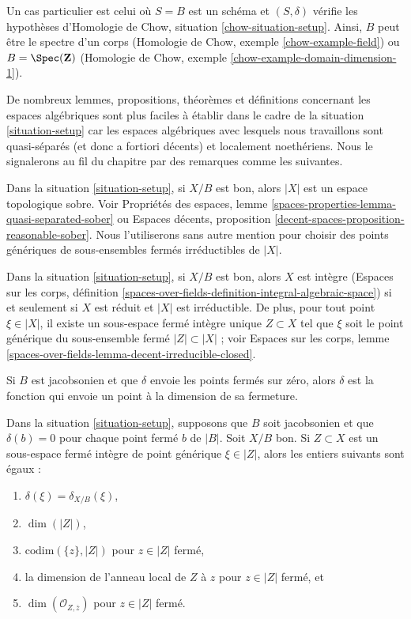\noindent
Un cas particulier est celui où $S = B$ est un schéma et $(S, \delta)$ vérifie
les hypothèses d'Homologie de Chow, situation \ref{chow-situation-setup}.
Ainsi, $B$ peut être le spectre d'un corps (Homologie de Chow, exemple
\ref{chow-example-field}) ou $B = \Spec(\mathbf{Z})$ (Homologie de Chow, exemple
\ref{chow-example-domain-dimension-1}).

\medskip\noindent
De nombreux lemmes, propositions, théorèmes et définitions concernant les
espaces algébriques sont plus faciles à établir dans le cadre de la situation
\ref{situation-setup} car les espaces algébriques avec lesquels nous
travaillons sont quasi-séparés (et donc a fortiori décents) et localement
noethériens. Nous le signalerons au fil du chapitre par des remarques comme
les suivantes.

\begin{remark}
\label{remark-sober}
Dans la situation \ref{situation-setup}, si $X/B$ est bon, alors $|X|$ est un
espace topologique sobre. Voir Propriétés des espaces, lemme
\ref{spaces-properties-lemma-quasi-separated-sober} ou Espaces décents,
proposition \ref{decent-spaces-proposition-reasonable-sober}. Nous
l'utiliserons sans autre mention pour choisir des points génériques de
sous-ensembles fermés irréductibles de $|X|$.
\end{remark}

\begin{remark}
\label{remark-integral}
Dans la situation \ref{situation-setup}, si $X/B$ est bon, alors $X$ est
intègre (Espaces sur les corps, définition
\ref{spaces-over-fields-definition-integral-algebraic-space}) si et seulement
si $X$ est réduit et $|X|$ est irréductible. De plus, pour tout point $\xi \in
|X|$, il existe un sous-espace fermé intègre unique $Z \subset X$ tel que
$\xi$ soit le point générique du sous-ensemble fermé $|Z| \subset |X|$ ; voir
Espaces sur les corps, lemme
\ref{spaces-over-fields-lemma-decent-irreducible-closed}.
\end{remark}

\noindent
Si $B$ est jacobsonien et que $\delta$ envoie les points fermés sur zéro, alors
$\delta$ est la fonction qui envoie un point à la dimension de sa fermeture.

\begin{lemma}
\label{lemma-delta-is-dimension}
Dans la situation \ref{situation-setup}, supposons que $B$ soit jacobsonien et que
$\delta(b) = 0$ pour chaque point fermé $b$ de $|B|$. Soit $X/B$ bon. Si
$Z \subset X$ est un sous-espace fermé intègre de point générique $\xi \in
|Z|$, alors les entiers suivants sont égaux :
\begin{enumerate}
\item $\delta(\xi) = \delta_{X/B}(\xi)$,
\item $\dim(|Z|)$,
\item $\text{codim}(\{z\}, |Z|)$ pour $z \in |Z|$ fermé,
\item la dimension de l'anneau local de $Z$ à $z$ pour $z \in |Z|$ fermé, et
\item $\dim(\mathcal{O}_{Z, \overline{z}})$ pour $z \in |Z|$ fermé.
\end{enumerate}
\end{lemma}

